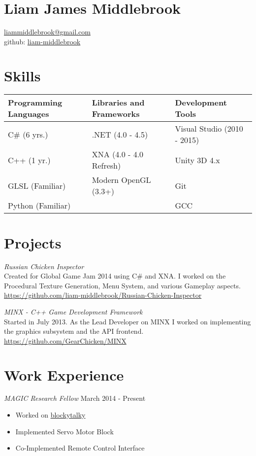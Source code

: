 \documentclass[line,margin]{res}
\begin{document}
\marginsize{.25in}{.25in}{.5in}{.25in}

\section{Liam James Middlebrook}

\href{mailto:liammiddlebrook@gmail.com}{liammiddlebrook@gmail.com}\\
github: \href{https://github.com/liam-middlebrook}{liam-middlebrook}

\begin{resume}


\section{Skills}
\begin{table}[h]
\begin{tabular}{@{}lll@{}}
\toprule
Programming Languages & Libraries and Frameworks & Development Tools           \\ \midrule
C\# (6 yrs.)          & .NET (4.0 - 4.5)         & Visual Studio (2010 - 2015) \\
C++ (1 yr.)           & XNA (4.0 - 4.0 Refresh)  & Unity 3D 4.x                \\
GLSL (Familiar)       & Modern OpenGL (3.3+)     & Git                         \\
Python (Familiar)     &                          & GCC                         \\ \bottomrule
\end{tabular}
\end{table}
\section{Projects}
{\sl Russian Chicken
Inspector}\\
Created for Global Game Jam 2014 using C\# and XNA. I worked on the Procedural
Texture Generation, Menu System, and various Gameplay aspects.\\
\url{https://github.com/liam-middlebrook/Russian-Chicken-Inspector}

{\sl MINX - C++ Game Development
Framework}\\
Started in July 2013. As the Lead Developer on MINX I worked on implementing
the graphics subsystem and the API frontend.\\
\url{https://github.com/GearChicken/MINX}


\section{Work Experience}
{\sl MAGIC Research Fellow} \hfill March 2014 - Present
\begin{itemize}
\itemsep1pt\parskip0pt
\item
  Worked on
  \href{https://github.com/liam-middlebrook/blockytalky.git}{blockytalky}
\item
  Implemented Servo Motor Block
\item
  Co-Implemented Remote Control Interface
\end{itemize}


\end{resume}
\end{document}
